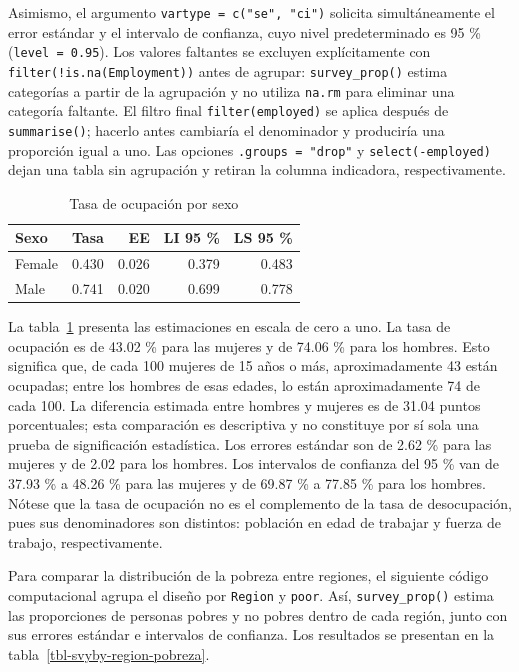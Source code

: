 \documentclass[
  spanish,
  11pt,
  letterpaper,
  oneside,
  open=any]{scrbook}
\begin{document}
Asimismo, el argumento \texttt{vartype\ =\ c("se",\ "ci")} solicita
simultáneamente el error estándar y el intervalo de confianza, cuyo
nivel predeterminado es 95 \% (\texttt{level\ =\ 0.95}). Los valores
faltantes se excluyen explícitamente con
\texttt{filter(!is.na(Employment))} antes de agrupar:
\texttt{survey\_prop()} estima categorías a partir de la agrupación y no
utiliza \texttt{na.rm} para eliminar una categoría faltante. El filtro
final \texttt{filter(employed)} se aplica después de
\texttt{summarise()}; hacerlo antes cambiaría el denominador y
produciría una proporción igual a uno. Las opciones
\texttt{.groups\ =\ "drop"} y \texttt{select(-employed)} dejan una tabla
sin agrupación y retiran la columna indicadora, respectivamente.

{

\begin{longtable}[]{@{}lrrrr@{}}

\caption{\label{tbl-tasa-ocupacion-sexo}Tasa de ocupación por sexo}

\tabularnewline

\toprule\noalign{}
Sexo & Tasa & EE & LI 95 \% & LS 95 \% \\
\midrule\noalign{}
\endhead
\bottomrule\noalign{}
\endlastfoot
Female & 0.430 & 0.026 & 0.379 & 0.483 \\
Male & 0.741 & 0.020 & 0.699 & 0.778 \\

\end{longtable}

}

La tabla~\ref{tbl-tasa-ocupacion-sexo} presenta las estimaciones en
escala de cero a uno. La tasa de ocupación es de 43.02 \% para las
mujeres y de 74.06 \% para los hombres. Esto significa que, de cada 100
mujeres de 15 años o más, aproximadamente 43 están ocupadas; entre los
hombres de esas edades, lo están aproximadamente 74 de cada 100. La
diferencia estimada entre hombres y mujeres es de 31.04 puntos
porcentuales; esta comparación es descriptiva y no constituye por sí
sola una prueba de significación estadística. Los errores estándar son
de 2.62 \% para las mujeres y de 2.02 para los hombres. Los intervalos
de confianza del 95 \% van de 37.93 \% a 48.26 \% para las mujeres y de
69.87 \% a 77.85 \% para los hombres. Nótese que la tasa de ocupación no
es el complemento de la tasa de desocupación, pues sus denominadores son
distintos: población en edad de trabajar y fuerza de trabajo,
respectivamente.

Para comparar la distribución de la pobreza entre regiones, el siguiente
código computacional agrupa el diseño por \texttt{Region} y
\texttt{poor}. Así, \texttt{survey\_prop()} estima las proporciones de
personas pobres y no pobres dentro de cada región, junto con sus errores
estándar e intervalos de confianza. Los resultados se presentan en la
tabla~\ref{tbl-svyby-region-pobreza}.
\end{document}
